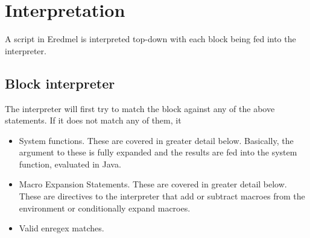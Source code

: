 \documentclass{article}
\begin{document}
\section{Interpretation}
A script in Eredmel is interpreted top-down with each block being fed into the interpreter.

\subsection{Block interpreter}
The interpreter will first try to match the block against any of the above statements. If it does not match any of them, it 
\begin{itemize}
\item System functions. These are covered in greater detail below. Basically, the argument to these is fully expanded and the results are fed into the system function, evaluated in Java.
\item Macro Expansion Statements. These are covered in greater detail below. These are directives to the interpreter that add or subtract macroes from the environment or conditionally expand macroes.
\item Valid enregex matches.
\end{itemize}
\end{document}
